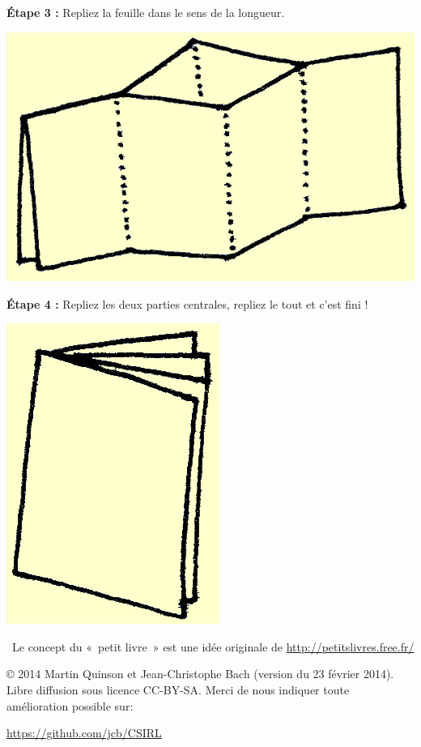 \documentclass[a4paper,12pt]{article}
\begin{document}
\begin{minipage}[b]{.45\linewidth}
\bigskip %
\noindent\textbf{Étape 3 :} Repliez la feuille dans le sens de la longueur.\\

\centerline{\includegraphics{img/ptitlivre-etape4.jpg}}
  
\bigskip

\noindent
\begin{minipage}{.6\linewidth}
\noindent\textbf{Étape 4 :} Repliez les deux parties centrales, repliez
le tout et c'est fini !
\end{minipage}\hfill%
\begin{minipage}{.35\linewidth}
  \includegraphics{img/ptitlivre-etape5.jpg}
\end{minipage}

\bigskip
\end{minipage}

\bigskip~\hfill{\small Le concept du «~petit livre~» est une idée
  originale de {\color{blue}\url{http://petitslivres.free.fr/}}}
  
\bigskip \bigskip \bigskip \normalsize %
\noindent\copyright{} 2014 Martin Quinson et Jean-Christophe Bach
(version du 23 février 2014). \\ Libre diffusion sous licence
CC-BY-SA. Merci de nous indiquer toute amélioration possible sur:

\centerline{\color{blue}\url{https://github.com/jcb/CSIRL}}
\end{document}

